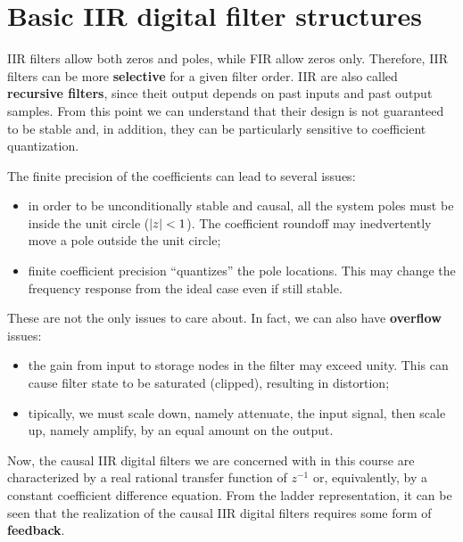\documentclass[../../main/main.tex]{subfiles}
\begin{document}

\section{Basic IIR digital filter structures}
IIR filters allow both zeros and poles, while FIR allow zeros only. Therefore, IIR filters can be more \textbf{selective} for a given filter order.
IIR are also called \textbf{recursive filters}, since theit output depends on past inputs and past output samples. From this point we can understand that their design is not guaranteed to be stable and, in addition, they can be particularly sensitive to coefficient quantization.

The finite precision of the coefficients can lead to several issues:
\begin{itemize}
    \item in order to be unconditionally stable and causal, all the system poles must be inside the unit circle (\( \abs{z} < 1 \)). The coefficient roundoff may inedvertently move a pole outside the unit circle;
    \item finite coefficient precision ``quantizes'' the pole locations. This may change the frequency response from the ideal case even if still stable.
\end{itemize}
These are not the only issues to care about. In fact, we can also have \textbf{overflow} issues:
\begin{itemize}
    \item the gain from input to storage nodes in the filter may exceed unity. This can cause filter state to be saturated (clipped), resulting in distortion;
    \item tipically, we must scale down, namely attenuate, the input signal, then scale up, namely amplify, by an equal amount on the output.
\end{itemize}


\medskip
Now, the causal IIR digital filters we are concerned with in this course are characterized by a real rational transfer function of \( z^{-1} \) or, equivalently, by a constant coefficient difference equation.
From the ladder representation, it can be seen that the realization of the causal IIR digital filters requires some form of \textbf{feedback}.
\end{document}
